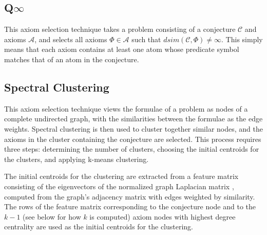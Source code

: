 \documentclass[EPiC]{easychair}
\begin{document}
\subsection{Q$\infty$}
\label{QinghuaInf}

This axiom selection technique takes a problem consisting of a conjecture 
$\mathcal{C}$ and axioms $\mathcal{A}$, and selects all axioms 
$\Phi \in \mathcal{A}$ such that $dsim(\mathcal{C},\Phi) \neq \infty$.
This simply means that each axiom contains at least one atom whose predicate
symbol matches that of an atom in the conjecture.

% 
\subsection{Spectral Clustering}
\label{Zishi}

This axiom selection technique views the formulae of a problem as nodes
of a complete undirected graph, with the similarities between the formulae 
as the edge weights.
Spectral clustering \cite{vLu07} is then used to cluster together similar 
nodes, and the axioms in the cluster containing the conjecture are selected.
This process requires three steps:
determining the number of clusters,
choosing the initial centroids for the clusters,
and
applying k-means clustering.

The initial centroids for the clustering are extracted from a feature matrix 
consisting of the eigenvectors of the normalized graph Laplacian matrix 
\cite{vLu07}, computed from the graph's adjacency matrix with edges weighted
by similarity.
The rows of the feature matrix corresponding to the conjecture node and to 
the $k-1$ (see below for how $k$ is computed) axiom nodes with highest degree 
centrality are used as the initial centroids for the clustering.
\end{document}

